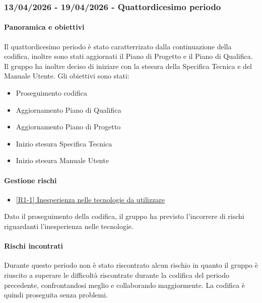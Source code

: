 \documentclass[a4paper,12pt]{article}
\begin{document}
        \subsubsection{13/04/2026 - 19/04/2026 - Quattordicesimo periodo}
            \paragraph{Panoramica e obiettivi}
            Il quattordicesimo periodo è stato caratterrizato dalla continuazione della codifica, inoltre sono stati aggiornati il Piano di Progetto e il Piano di Qualifica. Il gruppo ha inoltre deciso di iniziare con la stesura della Specifica Tecnica e del Manuale Utente. Gli obiettivi sono stati:
            \begin{itemize}
                \item Proseguimento codifica
                \item Aggiornamento Piano di Qualifica
                \item Aggiornamento Piano di Progetto
                \item Inizio stesura Specifica Tecnica
                \item Inizio stesura Manuale Utente
            \end{itemize}
            
            \paragraph{Gestione rischi}
                \begin{itemize}
                \item\hyperref[tab:r1]{[R1-1] Inesperienza nelle tecnologie da utilizzare}
                \end{itemize}
                Dato il proseguimento della codifica, il gruppo ha previsto l'incorrere di rischi riguardanti l'inesperienza nelle tecnologie.
    
                \paragraph*{Rischi incontrati}
                Durante questo periodo non è stato riscontrato alcun rischio in quanto il gruppo è riuscito a superare le difficoltà riscontrate durante la codifica del periodo precedente, confrontandosi meglio e collaborando maggiormente.
                La codifica è quindi proseguita senza problemi.
                
\end{document}
